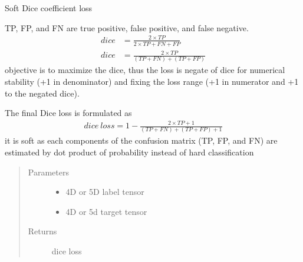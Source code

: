 \documentclass[letterpaper,10pt,english]{sphinxmanual}
\begin{document}
\begin{fulllineitems}
\label{\detokenize{index:unet.loss.dice_loss}}
Soft Dice coefficient loss

TP, FP, and FN are true positive, false positive, and false negative.
\begin{equation*}
\begin{split}dice  &=  \frac{2 \times TP}{ 2 \times TP + FN + FP} \\
dice  &=  \frac{2 \times TP}{(TP + FN) + (TP + FP)}\end{split}
\end{equation*}
objective is to maximize the dice, thus the loss is negate of dice for numerical stability (+1 in denominator)
and fixing the loss range (+1 in numerator and +1 to the negated dice).

The final Dice loss is formulated as
\begin{equation*}
\begin{split}dice \ loss = 1 - \frac{2 \times TP + 1}{(TP + FN) + (TP + FP ) + 1}\end{split}
\end{equation*}
it is soft as each components of the confusion matrix (TP, FP, and FN) are estimated by dot product of
probability instead of hard classification
\begin{quote}\begin{description}
\item[{Parameters}] \leavevmode\begin{itemize}
\item {} 
 \textendash{} 4D or 5D label tensor

\item {} 
 \textendash{} 4D or 5d target tensor

\end{itemize}

\item[{Returns}] \leavevmode
dice loss

\end{description}\end{quote}

\end{fulllineitems}

\end{document}
